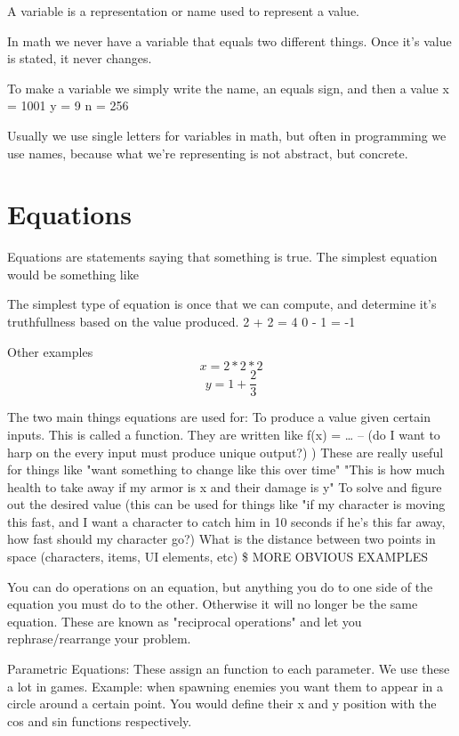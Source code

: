 \documentclass[11pt]{article}
\begin{document}
A variable is a representation or name used to represent a value.

In math we never have a variable that equals two different things. Once it's value is stated, it never changes. 

To make a variable we simply write the name, an equals sign, and then a value 
x = 1001
y = 9
n = 256

Usually we use single letters for variables in math, but often in programming we use names, because what we're representing is not abstract, but concrete. 

\section{Equations}
\label{sec-5}
Equations are statements saying that something is true. 
The simplest equation would be something like 

The simplest type of equation is once that we can compute, and determine it's truthfullness based on the value produced. 
2 + 2 = 4 
0 - 1 = -1

Other examples
\begin{equation}
x = 2 * 2 * 2
\end{equation}
\begin{equation}
y = 1 + \frac{2}{3}
\end{equation}

The two main things equations are used for: 
  To produce a value given certain inputs. This is called a function. They are written like f(x) = \ldots{}
    -- (do I want to harp on the every input must produce unique output?) )
    These are really useful for things like "want something to change like this over time"
    "This is how much health to take away if my armor is x and their damage is y"
  To solve and figure out the desired value (this can be used for things like "if my character is moving this fast, and I want a character to catch him in 10 seconds if he's this far away, how fast should my character go?)
    What is the distance between two points in space (characters, items, UI elements, etc)
    \$ MORE OBVIOUS EXAMPLES



You can do operations on an equation, but anything you do to one side of the equation you must do to the other. Otherwise it will no longer be the same equation. 
These are known as "reciprocal operations" and let you rephrase/rearrange your problem. 

Parametric Equations: These assign an function to each parameter. We use these a lot in games. 
Example: when spawning enemies you want them to appear in a circle around a certain point. You would define their x and y position with the cos and sin functions respectively.
\end{document}
